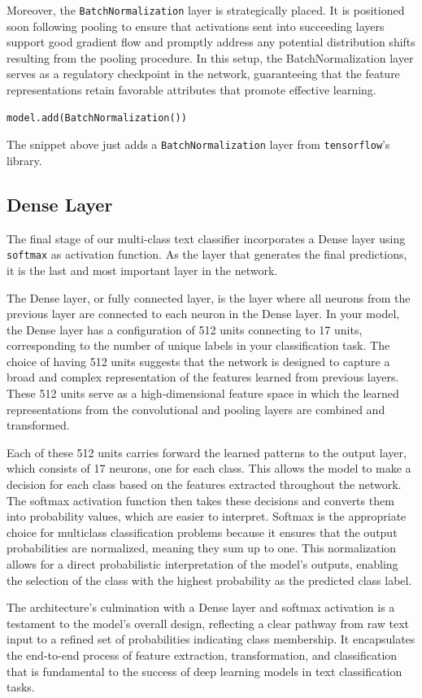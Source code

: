 Moreover, the \verb|BatchNormalization| layer is strategically placed. It is positioned soon following pooling to ensure that activations sent into succeeding layers support good gradient flow and promptly address any potential distribution shifts resulting from the pooling procedure. In this setup, the BatchNormalization layer serves as a regulatory checkpoint in the network, guaranteeing that the feature representations retain favorable attributes that promote effective learning.

\begin{lstlisting}[language=Python]
model.add(BatchNormalization())
\end{lstlisting}
The snippet above just adds a \verb|BatchNormalization| layer from \verb|tensorflow|'s library.

\subsection{Dense Layer}
The final stage of our multi-class text classifier incorporates a Dense layer using \verb|softmax| as activation function. As the layer that generates the final predictions, it is the last and most important layer in the network.

The Dense layer, or fully connected layer, is the layer where all neurons from the previous layer are connected to each neuron in the Dense layer. In your model, the Dense layer has a configuration of 512 units connecting to 17 units, corresponding to the number of unique labels in your classification task. The choice of having 512 units suggests that the network is designed to capture a broad and complex representation of the features learned from previous layers. These 512 units serve as a high-dimensional feature space in which the learned representations from the convolutional and pooling layers are combined and transformed.

Each of these 512 units carries forward the learned patterns to the output layer, which consists of 17 neurons, one for each class. This allows the model to make a decision for each class based on the features extracted throughout the network. The softmax activation function then takes these decisions and converts them into probability values, which are easier to interpret. Softmax is the appropriate choice for multiclass classification problems because it ensures that the output probabilities are normalized, meaning they sum up to one. This normalization allows for a direct probabilistic interpretation of the model's outputs, enabling the selection of the class with the highest probability as the predicted class label.

The architecture's culmination with a Dense layer and softmax activation is a testament to the model's overall design, reflecting a clear pathway from raw text input to a refined set of probabilities indicating class membership. It encapsulates the end-to-end process of feature extraction, transformation, and classification that is fundamental to the success of deep learning models in text classification tasks.